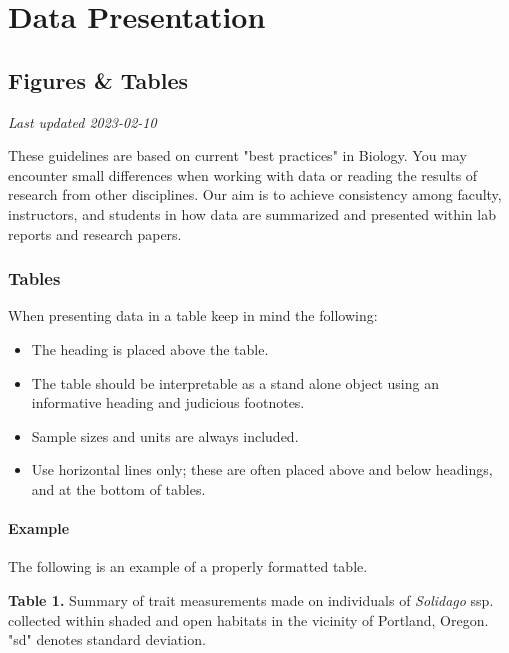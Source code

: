 \documentclass[
]{book}
\providecommand{\tightlist}{%
  \setlength{\itemsep}{0pt}\setlength{\parskip}{0pt}}
\begin{document}
\hypertarget{part-data-presentation}{%
\part*{Data Presentation}\label{part-data-presentation}}

\hypertarget{figures-tables}{%
\chapter{Figures \& Tables}\label{figures-tables}}

\emph{Last updated 2023-02-10}

These guidelines are based on current "best practices" in Biology. You may encounter small differences when working with data or reading the results of research from other disciplines. Our aim is to achieve consistency among faculty, instructors, and students in how data are summarized and presented within lab reports and research papers.

\hypertarget{tables}{%
\section{Tables}\label{tables}}

When presenting data in a table keep in mind the following:

\begin{itemize}
\tightlist
\item
  The heading is placed above the table.
\item
  The table should be interpretable as a stand alone object using an informative heading and judicious footnotes.
\item
  Sample sizes and units are always included.
\item
  Use horizontal lines only; these are often placed above and below headings, and at the bottom of tables.
\end{itemize}

\hypertarget{example}{%
\subsection*{Example}\label{example}}

The following is an example of a properly formatted table.

\textbf{Table 1.} Summary of trait measurements made on individuals of \emph{Solidago} ssp. collected within shaded and open habitats in the vicinity of Portland, Oregon. "sd" denotes standard deviation.
\end{document}
